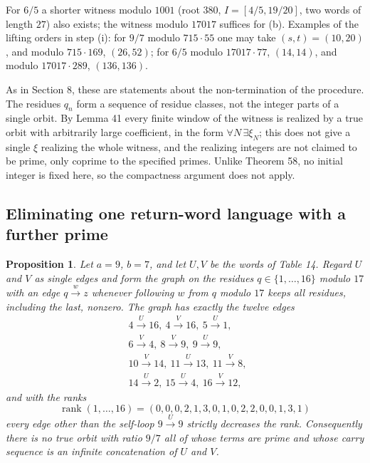 \documentclass[11pt,reqno]{amsart}
\newtheorem{proposition}[theorem]{Proposition}
\theoremstyle{definition}
\theoremstyle{remark}
\begin{document}
For \(6/5\) a shorter witness modulo \(1001\) (root \(380\),
\(I=[4/5,19/20]\), two words of length \(27\)) also exists; the
witness modulo \(17017\) suffices for (b). Examples of the lifting
orders in step (i): for \(9/7\) modulo \(715\cdot55\) one may take
\((s,t)=(10,20)\), and modulo \(715\cdot169\), \((26,52)\); for
\(6/5\) modulo \(17017\cdot77\), \((14,14)\), and modulo
\(17017\cdot289\), \((136,136)\).

As in Section 8, these are statements about the non-termination of the
procedure. The residues \(q_n\) form a sequence of residue classes, not
the integer parts of a single orbit. By Lemma 41 every finite window of
the witness is realized by a true orbit with arbitrarily large
coefficient, in the form \(\forall N\,\exists\xi_N\); this does not give
a single \(\xi\) realizing the whole witness, and the realizing integers
are not claimed to be prime, only coprime to the specified primes.
Unlike Theorem 58, no initial integer is fixed here, so the compactness
argument does not apply.

\subsection{Eliminating one return-word language with a further prime}\label{sec:E.3}

\begin{samepage}
\begin{proposition}\leavevmode\label{thm:71}
Let \(a=9\), \(b=7\), and let \(U,V\) be the words
of Table 14. Regard \(U\) and \(V\) as single edges and form the graph
on the residues \(q\in\{1,\ldots,16\}\) modulo \(17\) with an edge
\(q\xrightarrow{w}z\) whenever following \(w\) from \(q\) modulo \(17\)
keeps all residues, including the last, nonzero. The graph has exactly
the twelve edges
\[
\begin{aligned}
&4\xrightarrow{U}16,\ 4\xrightarrow{V}16,\ 5\xrightarrow{U}1,\
\\
&6\xrightarrow{V}4,\ 8\xrightarrow{V}9,\ 9\xrightarrow{U}9,\
\\
&10\xrightarrow{V}14,\ 11\xrightarrow{U}13,\ 11\xrightarrow{V}8,\
\\
&14\xrightarrow{U}2,\ 15\xrightarrow{U}4,\ 16\xrightarrow{V}12,
\end{aligned}
\]
and with the ranks
\[
\operatorname{rank}(1,\ldots,16)=(0,0,0,2,1,3,0,1,0,2,2,0,0,1,3,1)
\]
every edge other than the self-loop \(9\xrightarrow{U}9\) strictly
decreases the rank. Consequently there is no true orbit with ratio
\(9/7\) all of whose terms are prime and whose carry sequence is an
infinite concatenation of \(U\) and \(V\).
\label{thm-end:71}
\end{proposition}
\end{samepage}
\end{document}
